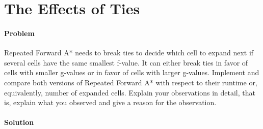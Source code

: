 \section{The Effects of Ties}

\paragraph{Problem} 
Repeated Forward A* needs to break ties to decide which
cell to expand next if several cells have the same smallest f-value. It can
either break ties in favor of cells with smaller g-values or in favor of cells
with larger g-values. Implement and compare both versions of Repeated Forward
A* with respect to their runtime or, equivalently, number of expanded cells.
Explain your observations in detail, that is, explain what you observed and
give a reason for the observation.

\paragraph{Solution}
